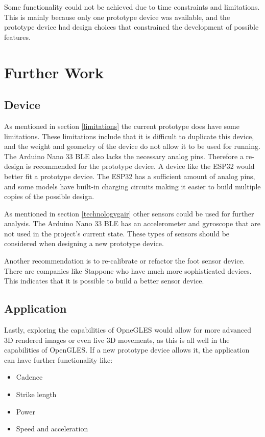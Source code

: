   Some functionality could not be achieved due to time constraints and limitations. This is mainly because only one prototype device was available, and the prototype device had design choices that constrained the development of possible features.


\clearpage
\chapter{Further Work}
\label{chap:furtherwork}

\section{Device}

As mentioned in section \ref{limitations} the current prototype does have some limitations. These limitations include that it is difficult to duplicate this device, and the weight and geometry of the device do not allow it to be used for running. The Arduino Nano 33 BLE also lacks the necessary analog pins. Therefore a re-design is recommended for the prototype device. A device like the ESP32 would better fit a prototype device. The ESP32 has a sufficient amount of analog pins, and some models have built-in charging circuits making it easier to build multiple copies of the possible design.

As mentioned in section \ref{technologygair} other sensors could be used for further analysis. The Arduino Nano 33 BLE has an accelerometer and gyroscope that are not used in the project's current state. These types of sensors should be considered when designing a new prototype device.

Another recommendation is to re-calibrate or refactor the foot sensor device. There are companies like Stappone\cite{stappone}  who have much more sophisticated devices. This indicates that it is possible to build a better sensor device.
\section{Application}

Lastly,  exploring the capabilities of OpneGLES would allow for more advanced 3D rendered images or even live 3D movements, as this is all well in the capabilities of OpenGLES.
If a new prototype device allows it, the application can have further functionality like:
\begin{itemize}
    \item Cadence
    \item Strike length
    \item Power
    \item Speed and acceleration 
  \end{itemize}
